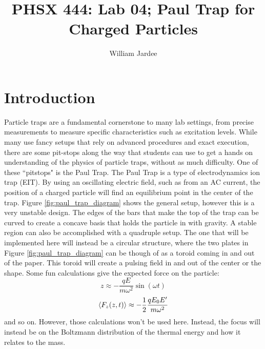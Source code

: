 \documentclass[12pt]{article}
\begin{document}
\title{PHSX 444: Lab 04; Paul Trap for Charged Particles}
\author{William Jardee}
\maketitle


\section{Introduction}

Particle traps are a fundamental cornerstone to many lab settings, from precise measurements to measure specific characteristics such as excitation levels. While many use fancy setups that rely on advanced procedures and exact execution, there are some pit-stops along the way that students can use to get a hands on understanding of the physics of particle traps, without as much difficulty. One of these ``pitstops" is the Paul Trap. The Paul Trap is a type of electrodynamics ion trap (EIT). By using an oscillating electric field, such as from an AC current, the position of a charged particle will find an equilibrium point in the center of the trap. Figure \ref{fig:paul_trap_diagram} shows the general setup, however this is a very unstable design. The edges of the bars that make the top of the trap can be curved to create a concave basis that holds the particle in with gravity. A stable region can also be accomplished with a quadruple setup. The one that will be implemented here will instead be a circular structure, where the two plates in Figure \ref{fig:paul_trap_diagram} can be though of as a toroid coming in and out of the paper. This toroid will create a pulsing field in and out of the center or the shape. Some fun calculations give the expected force on the particle:
\begin{equation*}
z \approx -\frac{q E}{m \omega^2}\sin(\omega t)
\end{equation*}
\begin{equation*}
\ev{F_z(z,t)} \approx -\frac{1}{2} \frac{qE_0 E^\prime}{m \omega^2}
\end{equation*}
and so on. However, those calculations won't be used here. Instead, the focus will instead be on the Boltzmann distribution of the thermal energy and how it relates to the mass. 
\end{document}
